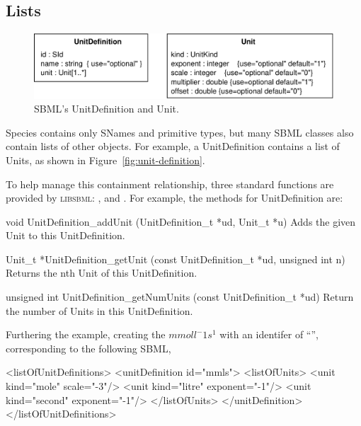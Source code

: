 \documentclass{sbmlmanual}
\newcommand{\libsbml}{\textsc{libsbml}}
\begin{document}
\subsection{Lists}
\label{sec:lists}

\begin{figure}[htb]
  \centering
  \includegraphics[scale=0.68]{unitdefinition}
  \caption{SBML's UnitDefinition and Unit.}
  \label{fig:unit-definition}
\end{figure}

Species contains only SNames and primitive types, but many SBML classes
also contain lists of other objects.  For example, a UnitDefinition
contains a list of Units, as shown in Figure~\vref{fig:unit-definition}.

To help manage this containment relationship, three standard functions are
provided by \libsbml{}: ,  and
.  For example, the methods for UnitDefinition
are:


\begin{methoddef}{void UnitDefinition\_addUnit (UnitDefinition\_t *ud,
Unit\_t *u)}
  Adds the given Unit to this UnitDefinition.
\end{methoddef}

\begin{methoddef}{Unit\_t *UnitDefinition\_getUnit (const UnitDefinition\_t
*ud, unsigned int n)}
Returns the nth Unit of this UnitDefinition.
\end{methoddef}

\begin{methoddef}{unsigned int UnitDefinition\_getNumUnits (const
UnitDefinition\_t *ud)}
  Return the number of Units in this UnitDefinition.
\end{methoddef}


Furthering the example, creating the  $mmol l^-1
s^1$ with an identifer of ``'', corresponding to the following SBML,

\begin{example}
<listOfUnitDefinitions>
  <unitDefinition id="mmls">
    <listOfUnits>
      <unit kind="mole"   scale="-3"/>
      <unit kind="litre"  exponent="-1"/>
      <unit kind="second" exponent="-1"/>
    </listOfUnits>
  </unitDefinition>
</listOfUnitDefinitions>
\end{example}
\end{document}
